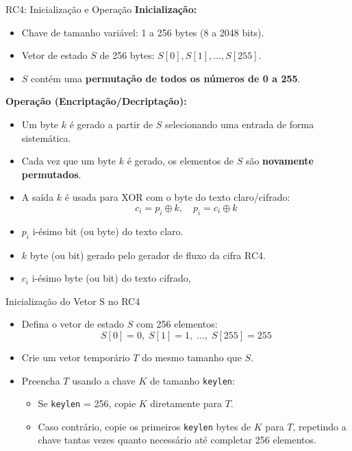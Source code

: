 \begin{frame}{RC4: Inicialização e Operação}
    \textbf{Inicialização:}
    \begin{itemize}
        \item Chave de tamanho variável: 1 a 256 bytes (8 a 2048 bits).
        \item Vetor de estado $S$ de 256 bytes: $S[0], S[1], \dots, S[255]$.
        \item $S$ contém uma \textbf{permutação de todos os números de 0 a 255}.
    \end{itemize}

    \textbf{Operação (Encriptação/Decriptação):}
    \begin{itemize}
        \item Um byte $k$ é gerado a partir de $S$ selecionando uma entrada de forma sistemática.
        \item Cada vez que um byte $k$ é gerado, os elementos de $S$ são \textbf{novamente permutados}.
        \item A saída $k$ é usada para XOR com o byte do texto claro/cifrado:
              \[
                  c_i = p_i \oplus k, \quad p_i = c_i \oplus k
              \]
    \end{itemize}

    \begin{itemize}
        \item $p_i$
              i-ésimo  bit (ou byte)  do texto claro.

        \item $k$ byte (ou bit) gerado pelo gerador de fluxo da cifra RC4.

        \item  $c_i$
              i-ésimo byte (ou bit) do texto cifrado,
    \end{itemize}

\end{frame}

\begin{frame}{Inicialização do Vetor S no RC4}
    \begin{itemize}
        \item Defina o vetor de estado $S$ com 256 elementos:
              \[
                  S[0] = 0, \; S[1] = 1, \; \dots, \; S[255] = 255
              \]
        \item Crie um vetor temporário $T$ do mesmo tamanho que $S$.
        \item Preencha $T$ usando a chave $K$ de tamanho \texttt{keylen}:
              \begin{itemize}
                  \item Se \texttt{keylen} = 256, copie $K$ diretamente para $T$.
                  \item Caso contrário, copie os primeiros \texttt{keylen} bytes de $K$ para $T$, repetindo a chave tantas vezes quanto necessário até completar 256 elementos.
              \end{itemize}
    \end{itemize}
\end{frame}


